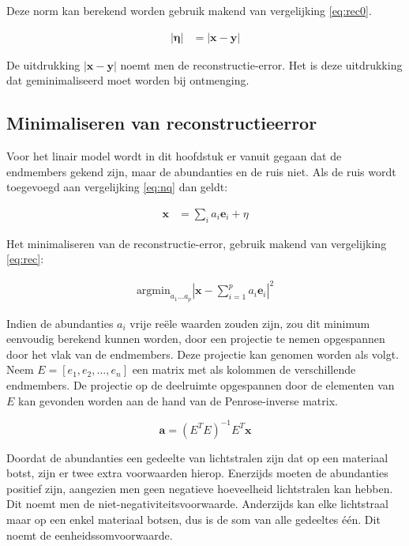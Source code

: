 \documentclass[12pt]{report}
\begin{document}
Deze norm kan berekend worden gebruik makend van vergelijking \ref{eq:rec0}.

\begin{eqnarray}
\left|\bm{\eta}\right| &= \left|\bm{x} - \bm{y}\right| \label{eq:rec}
\end{eqnarray}

De uitdrukking $\left|\bm{x} - \bm{y}\right|$ noemt men de reconstructie-error. Het is deze uitdrukking dat geminimaliseerd moet worden bij ontmenging. 


\subsection{Minimaliseren van reconstructieerror}
Voor het linair model wordt in dit hoofdstuk er vanuit gegaan dat de endmembers gekend zijn, maar de abundanties en de ruis niet. Als de ruis wordt toegevoegd aan vergelijking \ref{eq:nq} dan geldt:

\begin{align}
\bm{x} &= \sum_i a_i \bm{e}_i + \eta
\end{align}

Het minimaliseren van de reconstructie-error, gebruik makend van vergelijking \ref{eq:rec}:

\begin{align}
\text{argmin}_{a_1 ... a_p} \left| \bm{x} - \sum_{i=1}^p a_i \bm{e}_i\right|^2
\end{align}

Indien de abundanties $a_i$ vrije re\"ele waarden zouden zijn, zou dit minimum eenvoudig berekend kunnen worden, door een projectie te nemen opgespannen door het vlak van de endmembers. Deze projectie kan genomen worden als volgt. Neem $E = [e_1,e_2,...,e_n]$ een matrix met als kolommen de verschillende endmembers. De projectie op de deelruimte opgespannen door de elementen van $E$ kan gevonden worden aan de hand van de Penrose-inverse matrix.

\begin{equation}
\bm{a} = (E^T E)^{-1} E^T \bm{x}
\end{equation}

Doordat de abundanties een gedeelte van lichtstralen zijn dat op een materiaal botst, zijn er twee extra voorwaarden hierop. Enerzijds moeten de abundanties positief zijn, aangezien men geen negatieve hoeveelheid lichtstralen kan hebben. Dit noemt men de niet-negativiteitsvoorwaarde. Anderzijds kan elke lichtstraal maar op een enkel materiaal botsen, dus is de som van alle gedeeltes \'e\'en. Dit noemt de eenheidssomvoorwaarde.  
\end{document}
